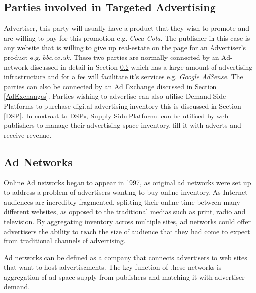 \documentclass{article}
\begin{document}
\subsection{Parties involved in Targeted Advertising}
Advertiser, this party will usually have a product that they wish to promote and are willing to pay for this promotion e.g. \textit{Coca-Cola}. The publisher in this case is any website that is willing to give up real-estate on the page for an Advertiser's product e.g. \textit{bbc.co.uk}. These two parties are normally connected by an Ad-network discussed in detail in Section \ref{AdNetwork} which has a large amount of advertising infrastructure and for a fee will facilitate it's services e.g. \textit{Google AdSense}. The parties can also be connected by an Ad Exchange discussed in Section \ref{AdExchanges}. Parties wishing to advertise can also utilise Demand Side Platforms to purchase digital advertising inventory this is discussed in Section \ref{DSP}. In contrast to DSPs, Supply Side Platforms can be utilised by web publishers to manage their advertising space inventory, fill it with adverts and receive revenue. 


\subsection{Ad Networks} \label{AdNetwork}
Online Ad networks began to appear in 1997, as original ad networks were set up to address a problem of advertisers wanting to buy online inventory. As Internet audiences are incredibly fragmented, splitting their online time between many different websites, as opposed to the traditional medias such as print, radio and television. By aggregating inventory across multiple sites, ad networks could offer advertisers the ability to reach the size of audience that they had come to expect from traditional channels of advertising. 
\newline

Ad networks can be defined as a company that connects advertisers to web sites that want to host advertisements. The key function of these networks is aggregation of ad space supply from publishers and matching it with advertiser demand. 
\end{document}
